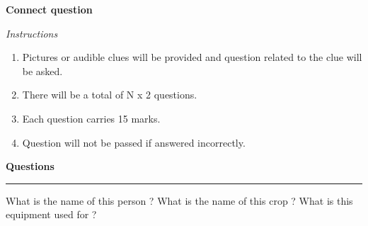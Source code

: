 \documentclass[10pt,a4paper,answers]{exam}
\begin{document}
\begin{center}
{\textbf {\LARGE Connect question}}
\end{center}

{\Large
\textit{Instructions}
}

\begin{enumerate}
\item Pictures or audible clues will be provided and question related to the clue will be asked. 
\item There will be a total of N x 2 questions.
\item Each question carries 15 marks.
\item Question will not be passed if answered incorrectly.
\end{enumerate}

\vspace{1cm}

{\Large
\textbf{Questions} \\[1mm]
\hrule
}


\begin{questions}
  \question What is the name of this person ?
  \question What is the name of this crop ?
  \question What is this equipment used for ? 
\end{questions}
\end{document}

